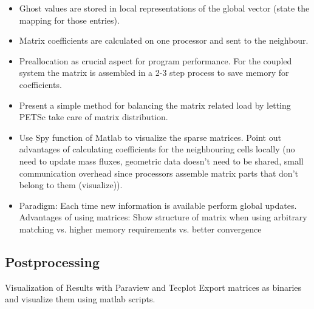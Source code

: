       \begin{itemize}
        \item Ghost values are stored in local representations of the global vector (state the mapping for those entries). 
        \item Matrix coefficients are calculated on one processor and sent to the neighbour. 
        \item Preallocation as crucial aspect for program performance. For the coupled system the matrix is assembled in a 2-3 step process to save memory for coefficients. 
        \item Present a simple method for balancing the matrix related load by letting PETSc take care of matrix distribution. 
        \item Use Spy function of Matlab to visualize the sparse matrices. Point out advantages of calculating coefficients for the neighbouring cells locally (no need to update mass fluxes, geometric data doesn't need to be shared, small communication overhead since processors assemble matrix parts that don't belong to them (visualize)). 
        \item Paradigm: Each time new information is available perform global updates. Advantages of using matrices: Show structure of matrix when using arbitrary matching vs. higher memory requirements vs. better convergence
      \end{itemize}

    \subsection{Postprocessing}
    
      Visualization of Results with Paraview and Tecplot
      Export matrices as binaries and visualize them using matlab scripts.
